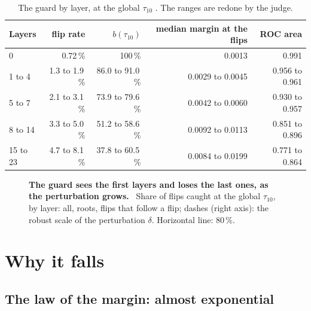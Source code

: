 \begin{table}[tbp]
\centering\small
\caption[The guard by layer]{The guard by layer, at the global $\tau_{10}$ \mes. The ranges are redone by the judge.}
\label{t3tro:tab:couches}
\begin{tabular}{@{}lrrrr@{}}
\toprule
Layers & flip rate & $b(\tau_{10})$ & median margin at the flips & ROC area \\
\midrule
0 & 0.72\,\% & 100\,\% & 0.0013 & 0.991 \\
1 to 4 & 1.3 to 1.9\,\% & 86.0 to 91.0\,\% & 0.0029 to 0.0045 & 0.956 to 0.961 \\
5 to 7 & 2.1 to 3.1\,\% & 73.9 to 79.6\,\% & 0.0042 to 0.0060 & 0.930 to 0.957 \\
8 to 14 & 3.3 to 5.0\,\% & 51.2 to 58.6\,\% & 0.0092 to 0.0113 & 0.851 to 0.896 \\
15 to 23 & 4.7 to 8.1\,\% & 37.8 to 60.5\,\% & 0.0084 to 0.0199 & 0.771 to 0.864 \\
\bottomrule
\end{tabular}
\end{table}

\begin{figure}[tbp]
\centering
\GrapheTropicaleCouches
\caption[The guard by layer]{\textbf{The guard sees the first layers and loses the last ones, as the perturbation grows.} \mes~Share of flips caught at the global $\tau_{10}$, by layer: all, roots, flips that follow a flip; dashes (right axis): the robust scale of the perturbation $\delta$. Horizontal line: 80\,\%. }
\label{fig:t3-trop-couches}
\end{figure}

\section{Why it falls}\label{t3tro:sec:pourquoi}

\subsection{The law of the margin: almost exponential}\label{t3tro:sec:loi-marge}

